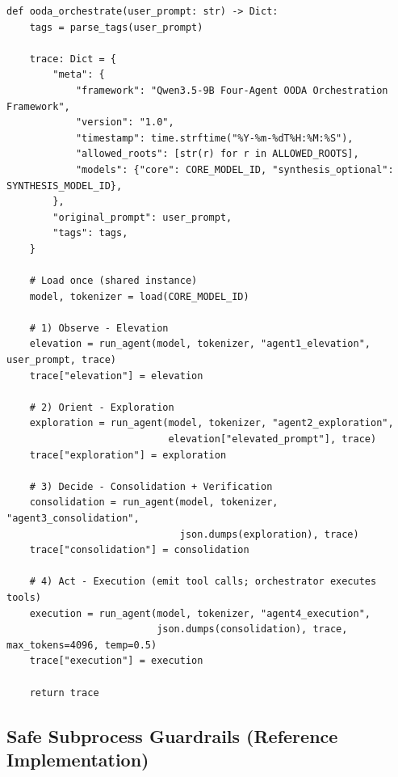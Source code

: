 \documentclass[11pt]{article}
\begin{document}
\begin{lstlisting}[style=python, caption={OODA orchestrator skeleton (single shared MLX-LM model)}]
def ooda_orchestrate(user_prompt: str) -> Dict:
    tags = parse_tags(user_prompt)

    trace: Dict = {
        "meta": {
            "framework": "Qwen3.5-9B Four-Agent OODA Orchestration Framework",
            "version": "1.0",
            "timestamp": time.strftime("%Y-%m-%dT%H:%M:%S"),
            "allowed_roots": [str(r) for r in ALLOWED_ROOTS],
            "models": {"core": CORE_MODEL_ID, "synthesis_optional": SYNTHESIS_MODEL_ID},
        },
        "original_prompt": user_prompt,
        "tags": tags,
    }

    # Load once (shared instance)
    model, tokenizer = load(CORE_MODEL_ID)

    # 1) Observe - Elevation
    elevation = run_agent(model, tokenizer, "agent1_elevation", user_prompt, trace)
    trace["elevation"] = elevation

    # 2) Orient - Exploration
    exploration = run_agent(model, tokenizer, "agent2_exploration",
                            elevation["elevated_prompt"], trace)
    trace["exploration"] = exploration

    # 3) Decide - Consolidation + Verification
    consolidation = run_agent(model, tokenizer, "agent3_consolidation",
                              json.dumps(exploration), trace)
    trace["consolidation"] = consolidation

    # 4) Act - Execution (emit tool calls; orchestrator executes tools)
    execution = run_agent(model, tokenizer, "agent4_execution",
                          json.dumps(consolidation), trace, max_tokens=4096, temp=0.5)
    trace["execution"] = execution

    return trace
\end{lstlisting}

\subsection{Safe Subprocess Guardrails (Reference Implementation)}
\end{document}
